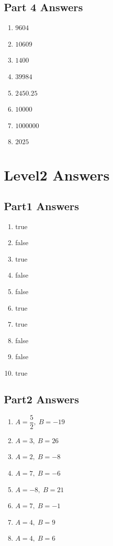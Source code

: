 \documentclass[12pt,a4paper]{article}
\begin{document}
	\subsection*{Part 4 Answers}
	\begin{enumerate}
		\item $9604$
		\item $10609$
		\item $1400$
		\item $39984$
		\item $2450.25$
		\item $10000$
		\item $1000000$
		\item $2025$
	\end{enumerate}
	\section{Level2 Answers}
	\subsection*{Part1 Answers}
	\begin{enumerate}
		\item true
		\item false
		\item true
		\item false
		\item false
		\item true
		\item true
		\item false
		\item false
		\item true
	\end{enumerate}
	\subsection*{Part2 Answers}
	\begin{enumerate}
		\item $A=\dfrac52,\; B=-19$
		\item $A=3,\; B=26$
		\item $A=2,\; B=-8$
		\item $A=7,\; B=-6$
		\item $A=-8,\; B=21$
		\item $A=7,\; B=-1$
		\item $A=4,\; B=9$
		\item $A=4,\; B=6$
	\end{enumerate}
\end{document}
